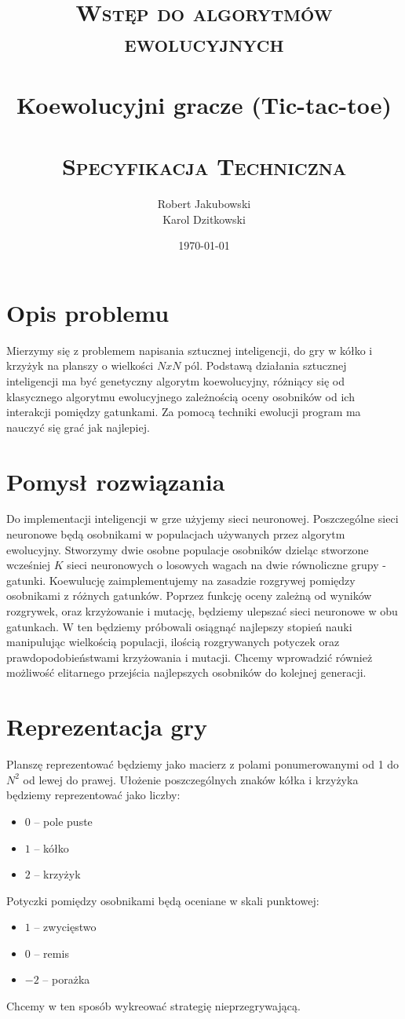 \documentclass[paper=a4, fontsize=11pt]{scrartcl} %
\title{
\vspace*{\fill}
\normalfont
\textsc{Wstęp do algorytmów ewolucyjnych}\\ [20pt]
\horrule{1.5pt} \\[0.4cm] %
\LARGE Koewolucyjni gracze (Tic-tac-toe)\\ %
\horrule{1.5pt} \\[0.1cm] %
\normalsize
\textsc{Specyfikacja Techniczna} \\ [20pt]
\vspace*{\fill}
}
\author{Robert Jakubowski \\Karol Dzitkowski} %
\date{\normalsize\today} %
\numberwithin{equation}{section} %
\numberwithin{figure}{section} %
\numberwithin{table}{section} %
\begin{document}
\maketitle

\thispagestyle{empty}
\clearpage

\tableofcontents

\clearpage

\section{Opis problemu}
Mierzymy się z problemem napisania sztucznej inteligencji, do gry w kółko i krzyżyk na planszy o wielkości $NxN$ pól.
Podstawą działania sztucznej inteligencji ma być genetyczny algorytm koewolucyjny, różniący się od klasycznego algorytmu ewolucyjnego zależnością oceny osobników od ich interakcji pomiędzy gatunkami. Za pomocą techniki ewolucji program ma nauczyć się grać jak najlepiej. 
\section{Pomysł rozwiązania}
Do implementacji inteligencji w grze użyjemy sieci neuronowej. Poszczególne sieci neuronowe będą osobnikami w populacjach używanych przez algorytm ewolucyjny. Stworzymy dwie osobne populacje osobników dzieląc stworzone wcześniej $K$ sieci neuronowych o losowych wagach na dwie równoliczne grupy - gatunki. Koewulucję zaimplementujemy na zasadzie rozgrywej pomiędzy osobnikami z różnych gatunków. Poprzez funkcję oceny zależną od wyników rozgrywek, oraz krzyżowanie i mutację, będziemy ulepszać sieci neuronowe w obu gatunkach. W ten będziemy próbowali osiągnąć najlepszy stopień nauki manipulując wielkością populacji, ilością rozgrywanych potyczek oraz prawdopodobieństwami krzyżowania i mutacji. Chcemy wprowadzić również możliwość elitarnego przejścia najlepszych osobników do kolejnej generacji.
\section{Reprezentacja gry}
Planszę reprezentować będziemy jako macierz z polami ponumerowanymi od 1 do $N^2$ od lewej do prawej. Ułożenie poszczególnych znaków kółka i krzyżyka będziemy reprezentować jako liczby:
\begin{itemize}
	\item $0$ -- pole puste
	\item $1$ -- kółko
	\item $2$ -- krzyżyk
\end{itemize}
Potyczki pomiędzy osobnikami będą oceniane w skali punktowej:
\begin{itemize}
	\item $1$ -- zwycięstwo
	\item $0$ -- remis
	\item $-2$ -- porażka
\end{itemize}
Chcemy w ten sposób wykreować strategię nieprzegrywającą. 
\end{document}
